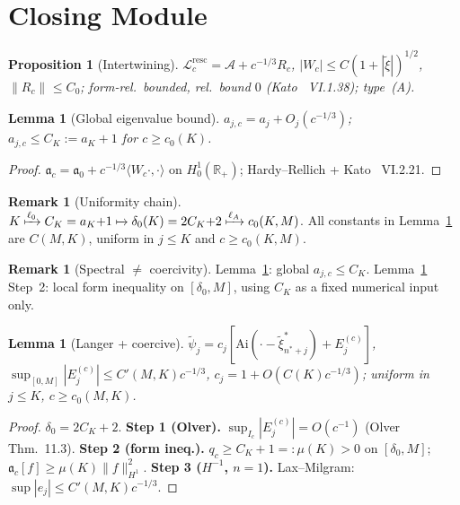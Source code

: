 \documentclass[12pt,a4paper]{amsart}
\newtheorem{lemma}[theorem]{Lemma}
\newtheorem{proposition}[theorem]{Proposition}
\theoremstyle{definition}
\newtheorem{remark}[theorem]{Remark}
\newcommand{\cA}{\mathcal{A}}
\newcommand{\R}{\mathbb{R}}
\newcommand{\Ai}{\mathrm{Ai}}
\newcommand{\Lc}{\mathcal{L}_c^{\mathrm{resc}}}
\newcommand{\xit}{\tilde{\xi}}
\newcommand{\normh}[2]{\|#1\|_{#2}}
\newcommand{\qa}{\mathfrak{a}}
\begin{document}
\section{Closing Module}
\label{sec:closing}

\begin{proposition}[Intertwining]
\label{prop:formbounded}
$\Lc=\cA+c^{-1/3}R_c$,
$|W_c|\leq C(1+|\xit|)^{1/2}$,
$\normh{R_c}{}\leq C_0$;
form-rel.\ bounded, rel.\ bound $0$
(Kato~\cite{Kato1966} VI.1.38); type~(A).
\end{proposition}

\begin{lemma}[Global eigenvalue bound]
\label{lem:slbound}
$a_{j,c}=a_j+O_j(c^{-1/3})$;
$a_{j,c}\leq C_K:=a_K+1$ for $c\geq c_0(K)$.
\end{lemma}
\begin{proof}
$\qa_c=\qa_0+c^{-1/3}\langle W_c\cdot,\cdot\rangle$ on $H^1_0(\R_+)$;
Hardy--Rellich + Kato~\cite{Kato1966} VI.2.21.
\end{proof}

\begin{remark}[Uniformity chain]
\label{rem:uniform}
$K\xmapsto{\ell_0}C_K=a_K{+}1
\xmapsto{}\delta_0(K)=2C_K{+}2
\xmapsto{\ell_A}c_0(K,M)$.
All constants in Lemma~\ref{lem:langer}
are $C(M,K)$, uniform in $j\leq K$ and $c\geq c_0(K,M)$.
\end{remark}

\begin{remark}[Spectral $\neq$ coercivity]
\label{rem:coercep}
Lemma~\ref{lem:slbound}: global $a_{j,c}\leq C_K$.
Lemma~\ref{lem:langer} Step~2: local form inequality
on $[\delta_0,M]$, using $C_K$ as a fixed numerical input only.
\end{remark}

\begin{lemma}[Langer + coercive]
\label{lem:langer}
$\tilde\psi_j=c_j[\Ai(\cdot-\xit_{n^*+j}^*)+E_j^{(c)}]$,
$\sup_{[0,M]}|E_j^{(c)}|\leq C'(M,K)c^{-1/3}$,
$c_j=1+O(C(K)c^{-1/3})$;
uniform in $j\leq K$, $c\geq c_0(M,K)$.
\end{lemma}
\begin{proof}
$\delta_0=2C_K+2$.
\textbf{Step 1 (Olver).}
$\sup_{I_c}|E_j^{(c)}|=O(c^{-1})$ (Olver~\cite{Olver1997} Thm.~11.3).
\textbf{Step 2 (form ineq.).}
$q_c\geq C_K+1=:\mu(K)>0$ on $[\delta_0,M]$;
$\qa_c[f]\geq\mu(K)\normh{f}{H^1}^2$.
\textbf{Step 3 ($H^{-1}$, $n=1$).}
Lax--Milgram: $\sup|e_j|\leq C'(M,K)c^{-1/3}$.
\end{proof}
\end{document}
